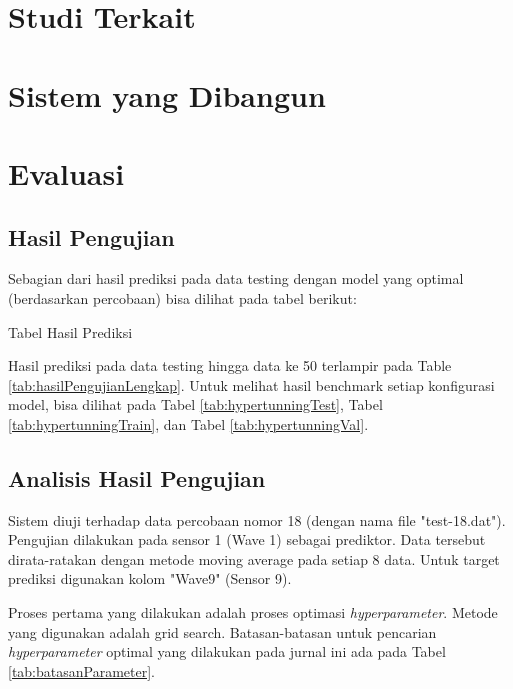 \section{Studi Terkait}


\section{Sistem yang Dibangun}



\section{Evaluasi}
\subsection{Hasil Pengujian}
Sebagian dari hasil prediksi pada data testing dengan model yang optimal (berdasarkan percobaan) bisa dilihat pada tabel berikut:

\begin{table}[h]
  \caption{Tabel Hasil Prediksi}
  \begin{center}
    
  \end{center}
  \label{tab:hasilPengujianLengkap10}
\end{table}

\FloatBarrier
\noindent Hasil prediksi pada data testing hingga data ke 50 terlampir pada Table \ref{tab:hasilPengujianLengkap}. Untuk melihat hasil benchmark setiap konfigurasi model, bisa dilihat pada Tabel \ref{tab:hypertunningTest}, Tabel \ref{tab:hypertunningTrain}, dan Tabel \ref{tab:hypertunningVal}.

\subsection{Analisis Hasil Pengujian}

Sistem diuji terhadap data percobaan nomor 18 (dengan nama file "test-18.dat"). Pengujian dilakukan pada sensor 1 (Wave 1) sebagai prediktor. Data tersebut dirata-ratakan dengan metode moving average pada setiap 8 data. Untuk target prediksi digunakan kolom "Wave9" (Sensor 9).

Proses pertama yang dilakukan adalah proses optimasi \emph{hyperparameter}. Metode yang digunakan adalah grid search. Batasan-batasan untuk pencarian \emph{hyperparameter} optimal yang dilakukan pada jurnal ini ada pada Tabel \ref{tab:batasanParameter}.

